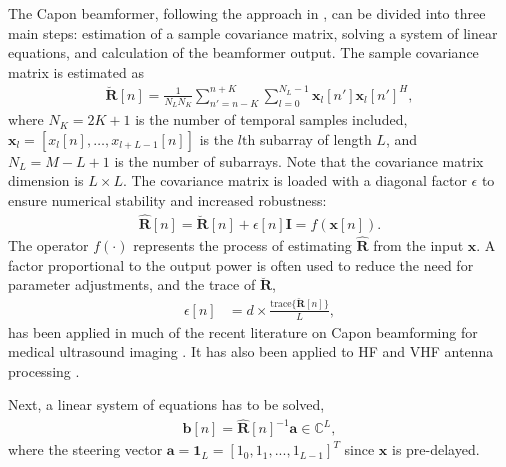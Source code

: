 \documentclass[journal]{IEEEtran}
\newcommand{\mat}[1]{\mathbf{#1}}
\renewcommand{\vec}[1]{\mathbf{#1}}
\begin{document}
The Capon beamformer, following the approach in \cite{Synnevag2009}, can be divided into three main steps: estimation of a sample covariance matrix, solving a system of linear equations, and calculation of the beamformer output.  The sample covariance matrix is estimated as 
\begin{align}
\mat{\breve{R}}[n] = \frac{1}{N_LN_K}\sum_{n'=n-K}^{n+K} \sum_{l=0}^{N_L-1} \vec{x}_l[n']\vec{x}_l[n']^H,\label{eq:R}
\end{align}
where  $N_K = 2K + 1$ is the number of temporal samples included, $\vec{x}_l = [x_l[n], \dotso, x_{l+L-1}[n]]$ is the $l\text{th}$ subarray of length $L$, and $N_L = M-L+1$ is the number of subarrays. Note that the covariance matrix dimension is $L \times L$. The covariance matrix is loaded with a diagonal factor $\epsilon$ to ensure numerical stability and increased robustness: 
\begin{align}\label{eq:diag}
\mat{\hat{R}}[n] = \mat{\breve{R}}[n] + \epsilon[n]\mat{I} = f(\vec{x}[n]).
\end{align}
The operator $f(\cdot)$ represents the process of estimating $\mat{\hat{R}}$ from the input $\vec{x}$.
A factor proportional to the output power is often used to reduce the need for parameter adjustments, and the trace of $\mat{\breve{R}}$, 
\begin{align}\label{eq:diag_adapt}
\epsilon[n] &= d \times \frac{\text{trace}\{\mat{\breve{R}}[n]\}}{L},
\end{align}
has been applied in much of the recent literature on Capon beamforming for medical ultrasound imaging \cite{Synnevag2007, Nilsen2009, Wang2009, Mehdizadeh2012}. It has also been applied to HF and VHF antenna processing \cite{Featherstone1997}.

Next, a linear system of equations has to be solved,
\begin{align}\label{eq:b}
\vec{b}[n] = \mat{\hat{R}}[n]^{-1}\vec{a} \in \mathbb{C}^L,
\end{align}
where the steering vector $\vec{a} = \vec{1}_L = [1_0, 1_1, ..., 1_{L-1}]^T$ since $\vec{x}$ is pre-delayed. 
\end{document}
